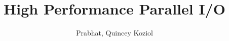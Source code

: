 \documentclass[sunil1,ChapterTOCs]{sunil}
\begin{document}
\bibliographyunit[\chapter]

\title{High Performance Parallel I/O}

\author{Prabhat, Quincey Koziol}


%
%
%



%

\mainmatter

%

\setcounter{page}{1}





\begin{bibunit}[plain]

\end{bibunit}


\clearpage
\printindex
\end{document}
